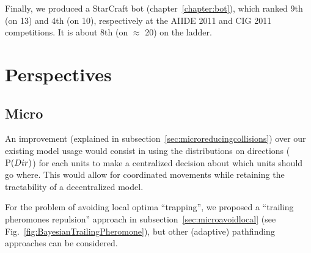 Finally, we produced a StarCraft bot (chapter~\ref{chapter:bot}), which ranked 9th (on 13) and 4th (on 10), respectively at the AIIDE 2011 and CIG 2011 competitions. It is about 8th (on $\approx$ 20) on the ladder.



\section{Perspectives}
\label{chapter:perspectives}
\subsection{Micro}
An improvement (explained in subsection~\ref{sec:microreducingcollisions}) over our existing model usage would consist in using the distributions on directions ($\mathrm{P}(Dir)$) for each units to make a centralized decision about which units should go where. This would allow for coordinated movements while retaining the tractability of a decentralized model. 

For the problem of avoiding local optima ``trapping'', we proposed a ``trailing pheromones repulsion'' approach in subsection~\ref{sec:microavoidlocal} (see Fig.~\ref{fig:BayesianTrailingPheromone}), but other (adaptive) pathfinding approaches can be considered.


